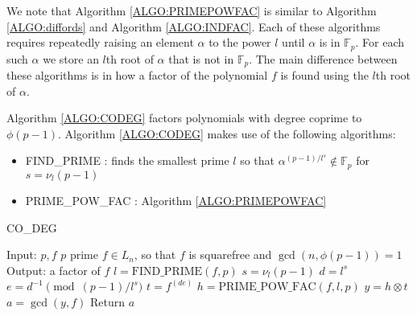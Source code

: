\documentclass{article}
\theoremstyle{plain}
\theoremstyle{definition}
\def\Fp {{ \mathbb{F} _ {p} }}
\begin{document}
		We note that Algorithm \ref{ALGO:PRIMEPOWFAC} is similar to Algorithm \ref{ALGO:diffords} and Algorithm \ref{ALGO:INDFAC}. Each of these algorithms requires repeatedly raising an element $\alpha$ to the power $l$ until $\alpha$ is in $\Fp$. For each such $\alpha$ we store an $l$th root of $\alpha$ that is not in $\Fp$. The main difference between these algorithms is in how a factor of the polynomial $f$ is found using the $l$th root of $\alpha$. 
				
		Algorithm \ref{ALGO:CODEG} factors polynomials with degree coprime to $\phi(p-1)$. Algorithm \ref{ALGO:CODEG} makes use of the following algorithms:
		\begin{itemize}
		    \item FIND\_PRIME : finds the smallest prime $l$ so that $\alpha^{(p-1)/l^s} \not\in \Fp$ for $s=\nu_l(p-1)$
		    \item PRIME\_POW\_FAC : Algorithm \ref{ALGO:PRIMEPOWFAC} 
	  \end{itemize}
	
		\begin{singlespace}
		\begin{algorithm}[H] 
		\label{ALGO:CODEG}
		\caption{CO\_DEG}
		\DontPrintSemicolon	
				Input: $p,f$ \;
				\hspace{2mm} $p$ prime \;
				\hspace{2mm} $f \in L_n$, so that $f$ is squarefree and $\gcd(n,\phi(p-1))=1$ \;
				Output: a factor of $f$ \;
				\; 
        $l=\textrm{FIND\_PRIME}(f,p) $\;   
        $s=\nu_l(p-1)$ \;
        $d=l^s$ \;
        $e=d^{-1} \pmod {(p-1)/l^s}$ \; 
        $t=f^{(de)}$ \;
        $h=\textrm{PRIME\_POW\_FAC}(f,l,p)$ \;
        $y=h \otimes t$ \;
        $a=\gcd(y,f)$ \;
        Return $a$ \;
	  \end{algorithm}	
		\end{singlespace} 
		\vspace{5mm}		
				
\end{document}
